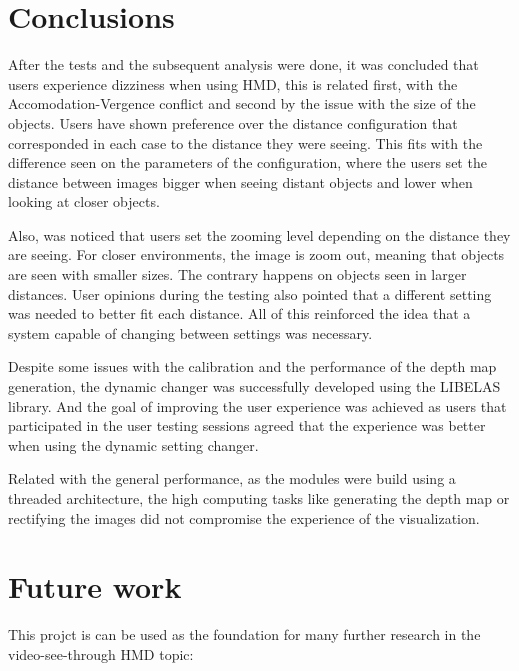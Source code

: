 \documentclass[10pt,a4paper,twocolumn,twoside]{article}
\begin{document}
	
	\section{Conclusions}
	After the tests and the subsequent analysis were done, it was concluded that users experience dizziness when using HMD, this is related first, with the Accomodation-Vergence conflict and second by the issue with the size of the objects.
	Users have shown preference over the distance configuration that corresponded in each case to the distance they were seeing. This fits with the difference seen on the parameters of the configuration, where the users set the distance between images bigger when seeing distant objects and lower when looking at closer objects. 
	
	Also, was noticed that users set the zooming level depending on the distance they are seeing. For closer environments, the image is zoom out, meaning that objects are seen with smaller sizes. The contrary happens on objects seen in larger distances. User opinions during the testing also pointed that a different setting was needed to better fit each distance. All of this reinforced the idea that a system capable of changing between settings was necessary. 
	
	Despite some issues with the calibration and the performance of the depth map generation, the dynamic changer was successfully developed using the LIBELAS library. And the goal of improving the user experience was achieved as users that participated in the user testing sessions agreed that the experience was better when using the dynamic setting changer. 
	
	Related with the general performance, as the modules were build using a threaded architecture, the high computing tasks like generating the depth map or rectifying the images did not compromise the experience of the visualization. 
	
	
	\section{Future work}
	This projct is can be used as the foundation for many further research in the video-see-through HMD topic: 
	
\end{document}
